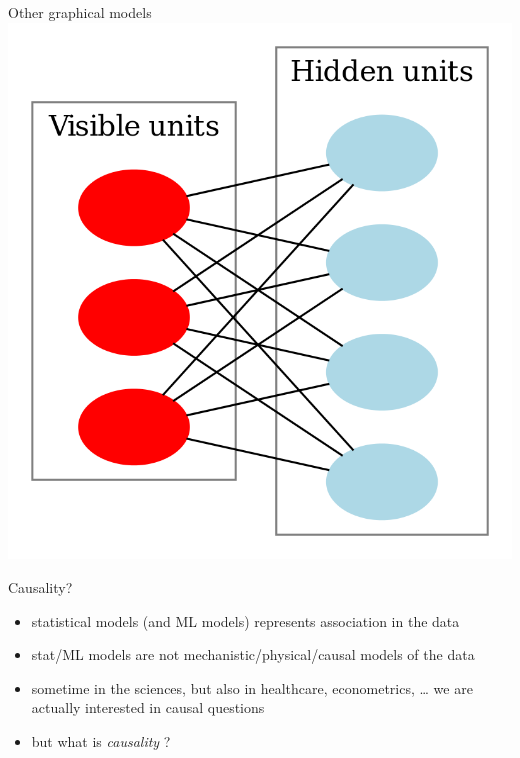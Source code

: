 \documentclass{beamer}
\begin{document}
\begin{frame}{Other graphical models}
	\includegraphics[scale=0.1]{images/restricted}
\end{frame}

\begin{frame}{Causality?} 
	\begin{itemize}
		\item<1-> statistical models (and ML models) represents association in the data 
		\item<2-> stat/ML models are not mechanistic/physical/causal models of the data 
		\item<3-> sometime in the sciences, but also in healthcare, econometrics, \ldots
			we are actually interested in causal questions
		\item<4-> but what is \emph{causality} ? 
	\end{itemize}

\end{frame}
\end{document}
